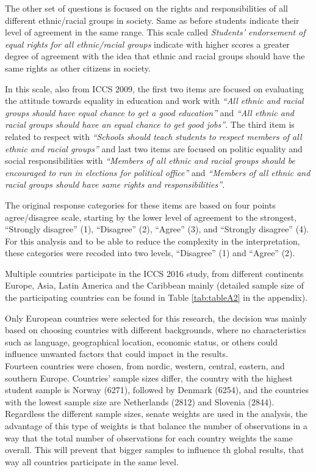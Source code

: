 \documentclass[12pt,a4paper,oneside]{reedthesis}
\begin{document}
The other set of questions is focused on the rights and responsibilities of all different ethnic/racial groups in society. Same as before students indicate their level of agreement in the same range. This scale called \emph{Students' endorsement of equal rights for all ethnic/racial groups} indicate with higher scores a greater degree of agreement with the idea that ethnic and racial groups should have the same rights as other citizens in society.

In this scale, also from ICCS 2009, the first two items are focused on evaluating the attitude towards equality in education and work with \emph{``All ethnic and racial groups should have equal chance to get a good education''} and \emph{``All ethnic and racial groups should have an equal chance to get good jobs''}. The third item is related to respect with \emph{``Schools should teach students to respect members of all ethnic and racial groups''} and last two items are focused on politic equality and social responsibilities with \emph{``Members of all ethnic and racial groups should be encouraged to run in elections for political office''} and \emph{``Members of all ethnic and racial groups should have same rights and responsibilities''}.

The original response categories for these items are based on four points agree/disagree scale, starting by the lower level of agreement to the strongest, ``Strongly disagree'' (1), ``Disagree'' (2), ``Agree'' (3), and ``Strongly disagree'' (4). For this analysis and to be able to reduce the complexity in the interpretation, these categories were recoded into two levels, ``Disagree'' (1) and ``Agree'' (2).

Multiple countries participate in the ICCS 2016 study, from different continents Europe, Asia, Latin America and the Caribbean mainly (detailed sample size of the participating countries can be found in Table \ref{tab:tableA2} in the appendix).

Only European countries were selected for this research, the decision was mainly based on choosing countries with different backgrounds, where no characteristics such as language, geographical location, economic status, or others could influence unwanted factors that could impact in the results.\\
Fourteen countries were chosen, from nordic, western, central, eastern, and southern Europe. Countries' sample sizes differ, the country with the highest student sample is Norway (6271), followed by Denmark (6254), and the countries with the lowest sample size are Netherlands (2812) and Slovenia (2844). Regardless the different sample sizes, senate weights are used in the analysis, the advantage of this type of weights is that balance the number of observations in a way that the total number of observations for each country weights the same overall. This will prevent that bigger samples to influence th global results, that way all countries participate in the same level.
\end{document}

